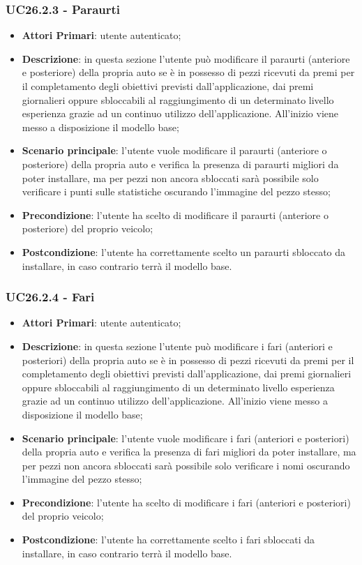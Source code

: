 \subsubsection{UC26.2.3 - Paraurti}
\begin{itemize}
	\item \textbf{Attori Primari}: utente autenticato;
	\item \textbf{Descrizione}: in questa sezione l'utente può modificare il paraurti (anteriore e posteriore) della propria auto se è in possesso di pezzi ricevuti da premi per il completamento degli obiettivi previsti dall'applicazione, dai premi giornalieri oppure sbloccabili al raggiungimento di un determinato livello esperienza grazie ad un continuo utilizzo dell'applicazione.
	All'inizio viene messo a disposizione il modello base;
	\item \textbf{Scenario principale}: l'utente vuole modificare il paraurti (anteriore o posteriore) della propria auto e verifica la presenza di paraurti migliori da poter installare, ma per pezzi non ancora sbloccati sarà possibile solo verificare i punti sulle statistiche oscurando l'immagine del pezzo stesso;
	\item \textbf{Precondizione}: l'utente ha scelto di modificare il paraurti (anteriore o posteriore) del proprio veicolo; 
	\item \textbf{Postcondizione}: l'utente ha correttamente scelto un paraurti sbloccato da installare, in caso contrario terrà il modello base.
\end{itemize}
\subsubsection{UC26.2.4 - Fari}
\begin{itemize}
	\item \textbf{Attori Primari}: utente autenticato;
	\item \textbf{Descrizione}: in questa sezione l'utente può modificare i fari (anteriori e posteriori) della propria auto se è in possesso di pezzi ricevuti da premi per il completamento degli obiettivi previsti dall'applicazione, dai premi giornalieri oppure sbloccabili al raggiungimento di un determinato livello esperienza grazie ad un continuo utilizzo dell'applicazione.
	All'inizio viene messo a disposizione il modello base;
	\item \textbf{Scenario principale}: l'utente vuole modificare i fari (anteriori e posteriori) della propria auto e verifica la presenza di fari migliori da poter installare, ma per pezzi non ancora sbloccati sarà possibile solo verificare i nomi oscurando l'immagine del pezzo stesso;
	\item \textbf{Precondizione}: l'utente ha scelto di modificare i fari (anteriori e posteriori) del proprio veicolo; 
	\item \textbf{Postcondizione}: l'utente ha correttamente scelto i fari sbloccati da installare, in caso contrario terrà il modello base.
\end{itemize}
